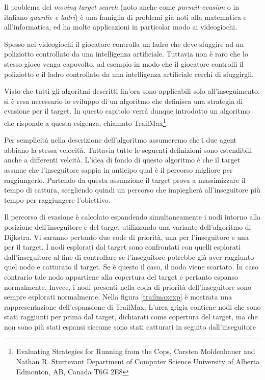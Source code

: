 \documentclass[11pt]{book}
\begin{document}
\par{Il problema del \emph{moving target search} (noto anche come \emph{pursuit-evasion} o in italiano \emph{guardie e ladri}) \`e una famiglia di problemi gi\`a noti alla matematica e all'informatica, ed ha molte applicazioni in particolar modo ai videogiochi.
}
\par{Spesso nei videogiochi il giocatore controlla un ladro che deve sfuggire ad un poliziotto controllato da una intelligenza artificiale. Tuttavia non \`e raro che lo stesso gioco venga capovolto, ad esempio in modo che il giocatore controlli il poliziotto e il ladro controllato da una intelligenza artificiale cerchi di sfuggirgli.}
\par{Visto che tutti gli algoritmi descritti fin'ora sono applicabili solo all'inseguimento, si \`e resa necessario lo sviluppo di un algoritmo che definisca una strategia di evasione per il target. In questo capitolo verr\`a dunque introdotto un algoritmo che risponde a questa esigenza, chiamato TrailMax\footnote{Evaluating Strategies for Running from the Cops, Carsten Moldenhauer
and
Nathan R. Sturtevant
Department of Computer Science
University of Alberta
Edmonton, AB, Canada T6G 2E8}.
}\par{Per semplicit\`a nella descrizione dell'algoritmo assumeremo che i due agent abbiano la stessa velocit\`a. Tuttavia tutte le seguenti definizioni sono estendibili anche a differenti velcit\`a. L'idea di fondo di questo algoritmo \`e che il target assume che l'inseguitore sappia in anticipo qual \`e il percorso migliore per raggiungerlo. Partendo da questa assunzione il target prova a massimizzare il tempo di cattura, scegliendo quindi un percorso che impiegher\`a all'inseguitore pi\`u tempo per raggiungere l'obiettivo.}
\par{Il percorso di evasione \`e calcolato espandendo simultaneamente i nodi intorno alla posizione dell'inseguitore e del target utilizzando una variante dell'algoritmo di Dijkstra. Vi saranno pertanto due code di priorit\`a, una per l'inseguitore e una per il target. I nodi esplorati dal target sono confrontati con quelli esplorati dall'inseguitore al fine di controllare se l'inseguitore potrebbe gi\`a aver raggiunto quel nodo e catturato il target. Se \`e questo il caso, il nodo viene scartato. In caso contrario tale nodo appartiene alla copertura del target e pertanto espanso normalmente. Invece, i nodi presenti nella coda di priorit\`a dell'inseguitore sono sempre esplorati normalmente. Nella figura \ref{trailmaxexp} \`e mostrata una rappresentazione dell'espansione di TrailMax. L'area grigia contiene nodi che sono stati raggiunti per prima dal target, dichiarati come copertura del target, ma che non sono pi\`u stati espansi siccome sono stati catturati in seguito dall'inseguitore}
\end{document}

